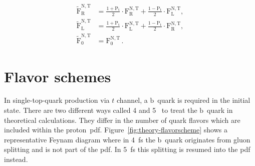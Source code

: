 \begin{subequations}
\begin{align}
\tilde{\mathrm{F}}_\mathrm{R}^\mathrm{N,T}&=\frac{1+\mathrm{P}_\mathrm{t}}{2}\cdot\mathrm{F}_\mathrm{R}^\mathrm{N,T}+\frac{1-\mathrm{P}_\mathrm{t}}{2}\cdot\mathrm{F}_\mathrm{L}^\mathrm{N,T}, \\
\tilde{\mathrm{F}}_\mathrm{L}^\mathrm{N,T}&=\frac{1+\mathrm{P}_\mathrm{t}}{2}\cdot\mathrm{F}_\mathrm{L}^\mathrm{N,T}+\frac{1-\mathrm{P}_\mathrm{t}}{2}\cdot\mathrm{F}_\mathrm{R}^\mathrm{N,T}, \\
\tilde{\mathrm{F}}_\mathrm{0}^\mathrm{N,T}&=\mathrm{F}_\mathrm{0}^\mathrm{N,T}\,.
\end{align}
\end{subequations}


\section{Flavor schemes}
\label{sec:theory-flavor-schemes}

In single-top-quark production via $t$ channel, a $\mathrm{b}$~quark is required in the initial state. There are two different ways called 4 and 5~ to treat the $\mathrm{b}$~quark in theoretical calculations. They differ in the number of quark flavors which are included within the proton~\gls{pdf}. Figure~\ref{fig:theory-flavorscheme} shows a representative Feynam diagram where in 4~\gls{fs} the $\mathrm{b}$~quark originates from gluon splitting and is not part of the \gls{pdf}. In 5~\gls{fs} this splitting is resumed into the \gls{pdf} instead.


